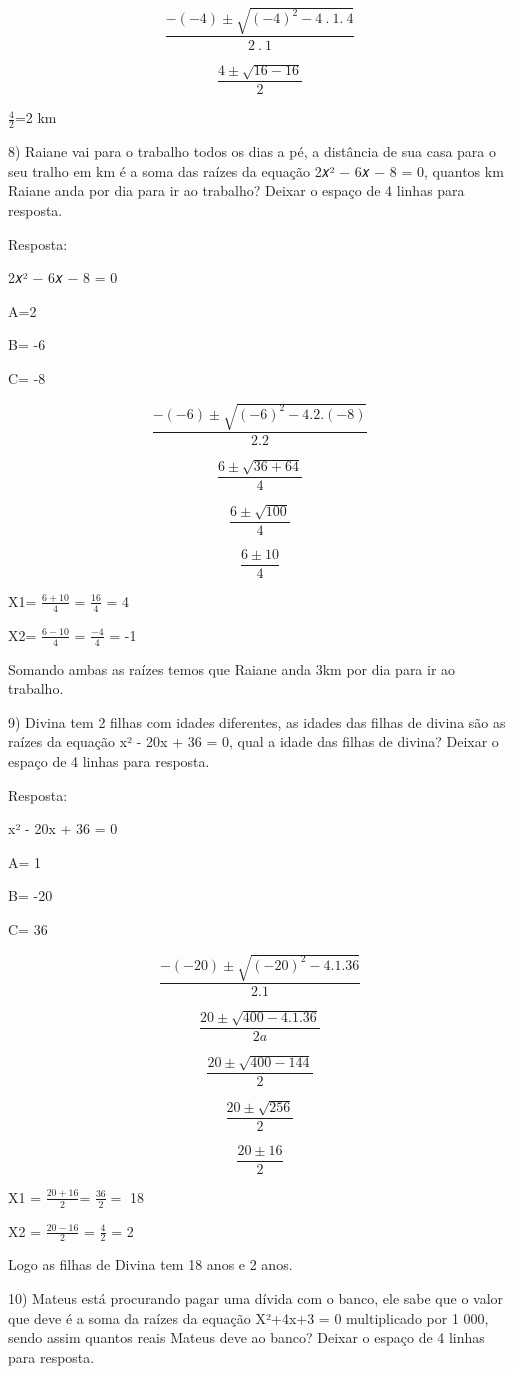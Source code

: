 {\[\frac{- ( - 4) \pm \sqrt{{( - 4)}^{2} - 4\ .\ 1.\ 4}}{2\ .\ 1}\]

\[\frac{4 \pm \sqrt{16 - 16}}{2}\]

\(\frac{4}{2}\)=2 km

8) Raiane vai para o trabalho todos os dias a pé, a distância de sua
casa para o seu tralho em km é a soma das raízes da equação 2𝑥² − 6𝑥 − 8
= 0, quantos km Raiane anda por dia para ir ao trabalho? Deixar o espaço
de 4 linhas para resposta.

Resposta:

2𝑥² − 6𝑥 − 8 = 0

A=2

B= -6

C= -8

\[\frac{- ( - 6) \pm \sqrt{{( - 6)}^{2} - 4.2.( - 8)}}{2.2}\]

\[\frac{6 \pm \sqrt{36 + 64}}{4}\]

\[\frac{6 \pm \sqrt{100}}{4}\]

\[\frac{6 \pm 10}{4}\]

X1= \(\frac{6 + 10}{4}\) = \(\frac{16}{4}\) = 4

X2= \(\frac{6 - 10}{4}\) = \(\frac{- 4}{4}\) = -1

Somando ambas as raízes temos que Raiane anda 3km por dia para ir ao
trabalho.

9) Divina tem 2 filhas com idades diferentes, as idades das filhas de
divina são as raízes da equação x² - 20x + 36 = 0, qual a idade das
filhas de divina? Deixar o espaço de 4 linhas para resposta.

Resposta:

x² - 20x + 36 = 0

A= 1

B= -20

C= 36

\[\frac{- ( - 20) \pm \sqrt{{( - 20)}^{2} - 4.1.36}}{2.1}\]

\[\frac{20 \pm \sqrt{400 - 4.1.36}}{2a}\]

\[\frac{20 \pm \sqrt{400 - 144}}{2}\]

\[\frac{20 \pm \sqrt{256}}{2}\]

\[\frac{20 \pm 16}{2}\]

X1 = \(\frac{20 + 16}{2}\)= \(\frac{36}{2} =\) 18

X2 = \(\frac{20 - 16}{2}\) = \(\frac{4}{2}\) = 2

Logo as filhas de Divina tem 18 anos e 2 anos.

10) Mateus está procurando pagar uma dívida com o banco, ele sabe que o
valor que deve é a soma da raízes da equação X²+4x+3 = 0 multiplicado
por 1 000, sendo assim quantos reais Mateus deve ao banco? Deixar o
espaço de 4 linhas para resposta.

}
